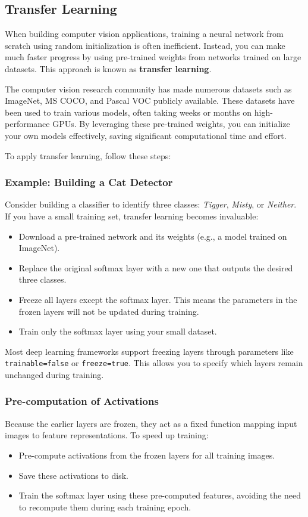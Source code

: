 \documentclass[letterpaper,12pt,notitlepage,twoside]{report}
\begin{document}
\subsection*{Transfer Learning}
When building computer vision applications, training a neural network from scratch using random initialization is often inefficient. Instead, you can make much faster progress by using pre-trained weights from networks trained on large datasets. This approach is known as \textbf{transfer learning}. 

The computer vision research community has made numerous datasets such as ImageNet, MS COCO, and Pascal VOC publicly available. These datasets have been used to train various models, often taking weeks or months on high-performance GPUs. By leveraging these pre-trained weights, you can initialize your own models effectively, saving significant computational time and effort.

To apply transfer learning, follow these steps:

\subsubsection*{Example: Building a Cat Detector}
Consider building a classifier to identify three classes: \textit{Tigger}, \textit{Misty}, or \textit{Neither}. If you have a small training set, transfer learning becomes invaluable:
\begin{itemize}[nosep]
    \item Download a pre-trained network and its weights (e.g., a model trained on ImageNet).
    \item Replace the original softmax layer with a new one that outputs the desired three classes.
    \item Freeze all layers except the softmax layer. This means the parameters in the frozen layers will not be updated during training.
    \item Train only the softmax layer using your small dataset.
\end{itemize}

Most deep learning frameworks support freezing layers through parameters like \texttt{trainable=false} or \texttt{freeze=true}. This allows you to specify which layers remain unchanged during training.

\subsubsection*{Pre-computation of Activations}
Because the earlier layers are frozen, they act as a fixed function mapping input images to feature representations. To speed up training:
\begin{itemize}[nosep]
    \item Pre-compute activations from the frozen layers for all training images.
    \item Save these activations to disk.
    \item Train the softmax layer using these pre-computed features, avoiding the need to recompute them during each training epoch.
\end{itemize}
\end{document}
